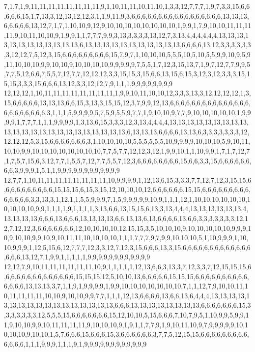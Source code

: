 7,1,7,1,9,11,11,11,11,11,11,11,11,9,1,10,11,11,10,11,10,1,3,3,12,7,7,7,1,9,7,3,3,15,6,6,6,6,6,15,1,7,13,3,12,13,12,12,3,1,1,9,11,9,3,6,6,6,6,6,6,6,6,6,6,6,6,6,6,6,6,6,13,13,13,6,6,6,6,6,13,12,7,1,7,1,10,10,9,12,9,10,10,10,10,10,10,10,10,1,9,9,1,7,9,10,10,11,11,11,11,9,10,11,10,10,9,1,9,9,1,1,7,7,7,9,9,3,13,3,3,3,3,13,12,7,3,13,4,4,4,4,4,4,13,13,13,13,13,13,13,13,13,13,13,13,6,13,13,13,13,13,13,13,13,13,13,13,6,6,6,6,13,12,3,3,3,3,3,3,3,12,12,7,5,12,3,15,6,6,6,6,6,6,6,6,6,15,7,9,7,1,10,10,10,5,5,5,10,5,10,5,5,9,9,10,9,5,9,11,10,10,10,9,9,10,10,9,10,10,10,10,9,9,9,9,9,7,5,5,1,7,12,3,15,13,7,1,9,7,12,7,7,9,9,5,7,7,5,12,6,6,7,5,5,7,12,7,7,12,12,12,3,3,15,15,3,15,6,6,13,15,6,15,3,12,3,12,3,3,3,15,15,15,3,3,3,15,6,6,6,13,12,3,3,12,12,7,9,1,1,1,9,9,9,9,9,9,9,9
12,12,12,1,10,11,11,11,11,11,11,11,11,1,9,9,10,11,10,10,12,3,3,3,13,3,12,12,12,12,1,3,15,6,6,6,6,6,13,13,13,6,6,15,3,13,3,15,15,12,3,7,9,9,12,13,6,6,6,6,6,6,6,6,6,6,6,6,6,6,6,6,6,6,6,6,6,6,6,3,1,1,1,5,9,9,9,9,5,7,5,9,5,5,9,7,7,1,9,10,10,9,7,7,9,10,10,10,10,10,1,9,9,9,9,1,7,7,7,1,1,1,9,9,9,9,1,3,13,6,15,3,3,3,12,3,13,4,4,4,4,13,13,13,13,13,13,13,13,13,13,13,13,13,13,13,13,13,13,13,13,13,13,13,6,13,13,13,6,6,6,6,13,13,6,3,3,3,3,3,3,3,12,12,12,12,5,3,15,6,6,6,6,6,6,6,3,1,10,10,10,10,5,5,5,5,5,5,10,9,9,9,9,10,10,10,5,9,10,11,10,10,9,9,10,10,10,10,10,10,10,10,7,7,5,7,7,12,12,3,12,1,9,9,10,1,1,10,9,9,1,7,1,7,12,7,1,7,5,7,15,6,3,12,7,7,1,5,5,7,12,7,7,5,5,7,12,3,6,6,6,6,6,6,6,6,15,6,6,3,3,15,6,6,6,6,6,6,6,6,3,9,9,9,1,5,1,1,9,9,9,9,9,9,9,9,9,9,9,9
12,7,7,1,10,11,11,11,11,11,11,11,11,10,9,9,9,9,1,12,13,6,15,3,3,3,7,7,12,7,12,3,15,15,6,6,6,6,6,6,6,6,6,6,15,15,15,6,15,3,15,12,10,10,10,12,6,6,6,6,6,6,15,15,6,6,6,6,6,6,6,6,6,6,6,6,6,6,3,3,13,3,1,12,1,1,5,5,9,9,9,7,1,5,9,9,9,9,9,10,9,1,1,1,12,1,10,10,10,10,10,10,10,10,10,10,9,9,1,1,1,1,9,1,1,1,1,3,13,6,6,13,15,15,6,13,3,13,4,4,4,13,13,13,13,13,13,4,13,13,13,13,6,6,6,13,6,6,6,13,13,13,13,6,6,13,13,6,13,6,6,6,6,13,6,6,3,3,3,3,3,3,3,12,12,7,12,12,3,6,6,6,6,6,6,6,12,10,10,10,10,12,15,15,3,5,10,10,10,9,10,10,10,10,10,9,9,9,10,9,10,10,9,9,10,9,10,11,11,10,10,10,10,1,1,1,7,7,7,9,7,9,9,10,10,10,5,1,10,9,9,9,1,10,10,9,9,9,1,12,5,15,6,12,7,7,7,12,3,3,12,7,12,3,15,6,6,6,13,3,15,6,6,6,6,6,6,6,6,6,6,6,6,6,6,6,6,13,12,7,1,9,9,1,1,1,1,1,9,9,9,9,9,9,9,9,9,9,9,9
12,12,7,9,10,11,11,11,11,11,11,10,9,1,1,1,1,1,12,13,6,6,3,13,3,7,12,3,3,7,12,15,15,15,6,6,6,6,6,6,6,6,6,6,6,6,6,6,15,15,15,12,5,10,10,13,6,6,6,6,6,15,15,15,6,6,6,6,6,6,6,6,6,6,6,6,6,6,13,13,13,3,7,1,1,9,1,9,9,9,9,1,9,9,10,10,10,10,10,10,10,7,1,1,12,7,9,10,10,11,10,11,11,11,11,10,10,9,10,10,9,9,7,7,1,1,1,12,13,6,6,6,6,13,6,6,13,6,4,4,4,13,13,13,13,13,13,13,13,13,13,13,13,13,13,13,13,13,6,6,6,13,13,13,13,13,13,13,13,6,6,6,6,6,6,6,15,3,3,3,3,3,3,3,12,5,5,5,15,6,6,6,6,6,6,6,15,12,10,10,5,15,6,6,6,7,10,7,9,5,1,10,9,9,5,9,9,11,9,10,10,9,9,10,11,11,11,11,9,10,10,10,9,1,9,1,1,7,7,9,1,9,10,11,10,9,7,9,9,9,9,9,10,10,10,10,9,10,10,1,5,7,6,6,6,15,6,6,6,15,3,6,6,6,6,6,6,3,7,7,5,12,15,15,6,6,6,6,6,6,6,6,6,6,6,6,6,1,1,1,9,9,9,1,1,1,9,1,9,9,9,9,9,9,9,9,9,9,9,9
